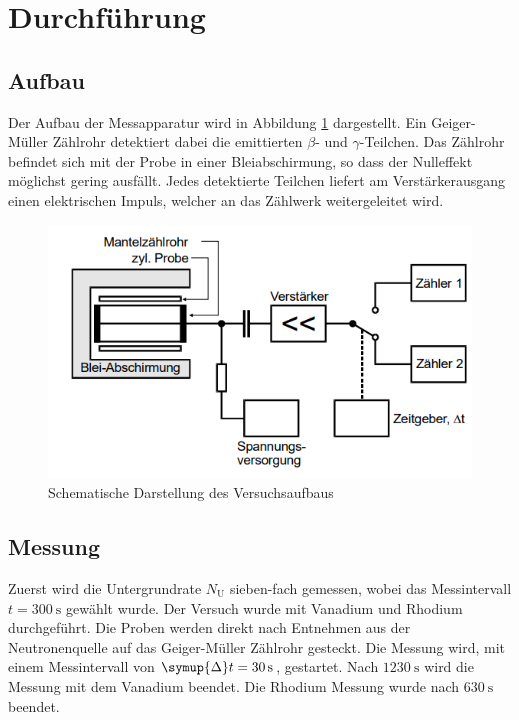 \section{Durchführung}
\label{sec:Durchführung}
\subsection{Aufbau}
Der Aufbau der Messapparatur wird in Abbildung \ref{fig:auf} dargestellt. Ein Geiger-Müller Zählrohr detektiert dabei die emittierten $\beta$- und $\gamma$-Teilchen.
Das Zählrohr befindet sich mit der Probe in einer Bleiabschirmung, so dass der Nulleffekt möglichst gering ausfällt. Jedes detektierte Teilchen liefert am Verstärkerausgang einen elektrischen Impuls, welcher an das Zählwerk weitergeleitet wird.  
\begin{figure}
    \centering
    \includegraphics[scale=0.6]{content/Aufbau.png}
    \caption{Schematische Darstellung des Versuchsaufbaus \cite{v703}}
    \label{fig:auf}
  \end{figure}
  \subsection{Messung}
  Zuerst wird die Untergrundrate $N_\text{U}$ sieben-fach gemessen, wobei das Messintervall $t=\SI{300}{\second}$ gewählt wurde. 
  Der Versuch wurde mit Vanadium und Rhodium durchgeführt. Die Proben werden direkt nach Entnehmen aus der Neutronenquelle auf das Geiger-Müller Zählrohr gesteckt.
  Die Messung wird, mit einem Messintervall von $\symup{\Delta}t=\SI{30}{\second}$, gestartet. Nach $\SI{1230}{\second}$ wird die Messung mit dem Vanadium beendet.
  Die Rhodium Messung wurde nach $\SI{630}{\second}$ beendet.